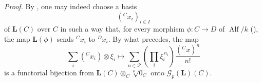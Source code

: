 \textit{Proof.}
By , one may indeed choose a basis
\[
  ({}^C x_i)_{i\in I}
\]
of \(\mathbf L(C)\) over \(C\) in such a way that, for every
morphism \(\phi:C\to D\) of \(\operatorname{Alf}/k\)
\textup{()}, the map \(\mathbf L(\phi)\) sends \({}^C x_i\) to
\({}^D x_i\). By what precedes, the map
\[
  \sum_i({}^C x_i)\otimes\xi_i
  \longmapsto
  \sum_{n\in\mathcal P}
  \left(\prod_i\xi_i^{\,n_i}\right)
  \frac{({}^C x)^n}{n!}
\]
is a functorial bijection from
\(\mathbf L(C)\otimes_C\sqrt[p]{0_C}\) onto
\(\mathscr G_p(\mathbf L)(C)\).

